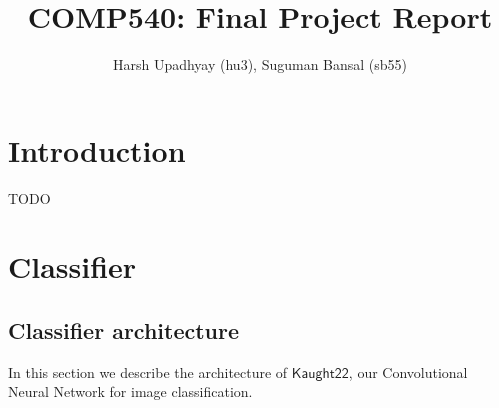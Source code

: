 \documentclass[]{article}
\title{COMP540: Final Project Report}
\author{Harsh Upadhyay (hu3), Suguman Bansal (sb55)}
\date{}
\newcommand*{\K}{\ensuremath{\mathsf{Kaught22}}}
\begin{document}
\maketitle

\begin{abstract}

\end{abstract}

\section{Introduction}
TODO

\section{Classifier}
\label{Sec:Classifier}

\subsection{Classifier architecture}
In this section we describe the architecture of $\K$, our Convolutional Neural Network for image classification. 
\end{document}
